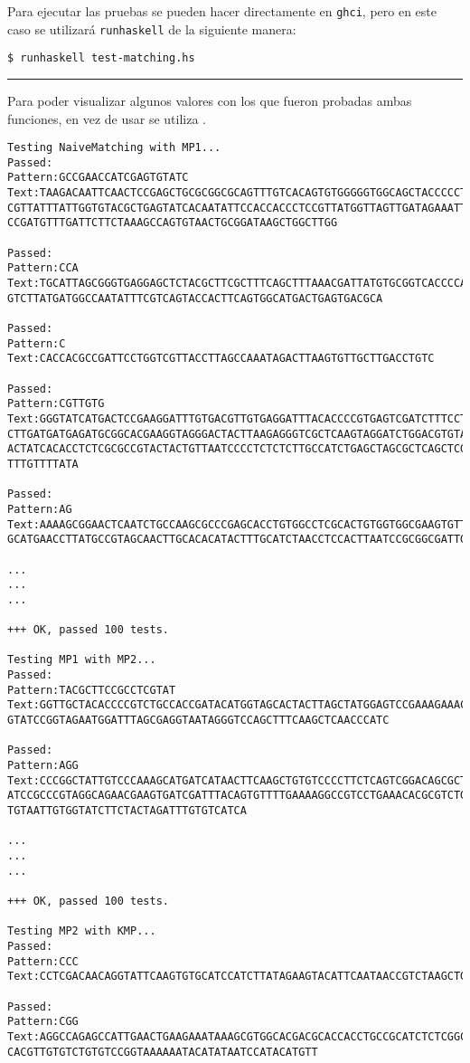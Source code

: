 Para ejecutar las pruebas se pueden hacer directamente en \texttt{ghci}, pero en este caso
se utilizará \texttt{runhaskell} de la siguiente manera:

\texttt{\$ runhaskell test-matching.hs}

\noindent\rule{\textwidth}{1pt}
Para poder visualizar algunos valores con los que fueron probadas ambas funciones, en vez de
usar  se utiliza .

\begin{verbatim}
Testing NaiveMatching with MP1...
Passed:
Pattern:GCCGAACCATCGAGTGTATC
Text:TAAGACAATTCAACTCCGAGCTGCGCGGCGCAGTTTGTCACAGTGTGGGGGTGGCAGCTACCCCCTAAG
CGTTATTTATTGGTGTACGCTGAGTATCACAATATTCCACCACCCTCCGTTATGGTTAGTTGATAGAAATTCGA
CCGATGTTTGATTCTTCTAAAGCCAGTGTAACTGCGGATAAGCTGGCTTGG

Passed:
Pattern:CCA
Text:TGCATTAGCGGGTGAGGAGCTCTACGCTTCGCTTTCAGCTTTAAACGATTATGTGCGGTCACCCCAATT
GTCTTATGATGGCCAATATTTCGTCAGTACCACTTCAGTGGCATGACTGAGTGACGCA

Passed:
Pattern:C
Text:CACCACGCCGATTCCTGGTCGTTACCTTAGCCAAATAGACTTAAGTGTTGCTTGACCTGTC

Passed:
Pattern:CGTTGTG
Text:GGGTATCATGACTCCGAAGGATTTGTGACGTTGTGAGGATTTACACCCCGTGAGTCGATCTTTCCTGGT
CTTGATGATGAGATGCGGCACGAAGGTAGGGACTACTTAAGAGGGTCGCTCAAGTAGGATCTGGACGTGTACAG
ACTATCACACCTCTCGCGCCGTACTACTGTTAATCCCCTCTCTCTTGCCATCTGAGCTAGCGCTCAGCTCGATA
TTTGTTTTATA

Passed:
Pattern:AG
Text:AAAAGCGGAACTCAATCTGCCAAGCGCCCGAGCACCTGTGGCCTCGCACTGTGGTGGCGAAGTGTTAAG
GCATGAACCTTATGCCGTAGCAACTTGCACACATACTTTGCATCTAACCTCCACTTAATCCGCGGCGATTGCAT

...
...
...

+++ OK, passed 100 tests.

Testing MP1 with MP2...
Passed:
Pattern:TACGCTTCCGCCTCGTAT
Text:GGTTGCTACACCCCGTCTGCCACCGATACATGGTAGCACTACTTAGCTATGGAGTCCGAAAGAAACCAG
GTATCCGGTAGAATGGATTTAGCGAGGTAATAGGGTCCAGCTTTCAAGCTCAACCCATC

Passed:
Pattern:AGG
Text:CCCGGCTATTGTCCCAAAGCATGATCATAACTTCAAGCTGTGTCCCCTTCTCAGTCGGACAGCGCTAGA
ATCCGCCCGTAGGCAGAACGAAGTGATCGATTTACAGTGTTTTGAAAAGGCCGTCCTGAAACACGCGTCTGTTA
TGTAATTGTGGTATCTTCTACTAGATTTGTGTCATCA

...
...
...

+++ OK, passed 100 tests.

Testing MP2 with KMP...
Passed:
Pattern:CCC
Text:CCTCGACAACAGGTATTCAAGTGTGCATCCATCTTATAGAAGTACATTCAATAACCGTCTAAGCTGCTG

Passed:
Pattern:CGG
Text:AGGCCAGAGCCATTGAACTGAAGAAATAAAGCGTGGCACGACGCACCACCTGCCGCATCTCTCGGCGCA
CACGTTGTGTCTGTGTCCGGTAAAAAATACATATAATCCATACATGTT


\end{verbatim}
